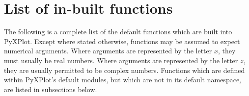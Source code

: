 %
%
%
%
%



\chapter{List of in-built functions}
\label{ch:function_list}

The following is a complete list of the default functions which are built into
PyXPlot. Except where stated otherwise, functions may be assumed to expect
numerical arguments. Where arguments are represented by the letter $x$, they
must usually be real numbers. Where arguments are represented by the letter
$z$, they are usually permitted to be complex numbers.  Functions which are
defined within PyXPlot's default modules, but which are not in its default
namespace, are listed in subsections below.

